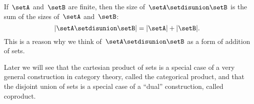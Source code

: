\begin{remark}
    If~$\setA$ and~$\setB$ are finite, then the size of~$\setA \setdisunion \setB$ is the sum of the sizes of~$\setA$ and~$\setB$:
    \begin{equation*}
        \vert \setA \setdisunion \setB \vert = \vert \setA \vert + \vert \setB \vert.
    \end{equation*}
    This is a reason why we think of~$\setA \setdisunion \setB$ as a form of addition of sets.
\end{remark}

\begin{remark}
    Later we will see that the cartesian product of sets is a special case of a very general construction in category theory, called the categorical product, and that the disjoint union of sets is a special case of a ``dual'' construction, called coproduct.
\end{remark}
